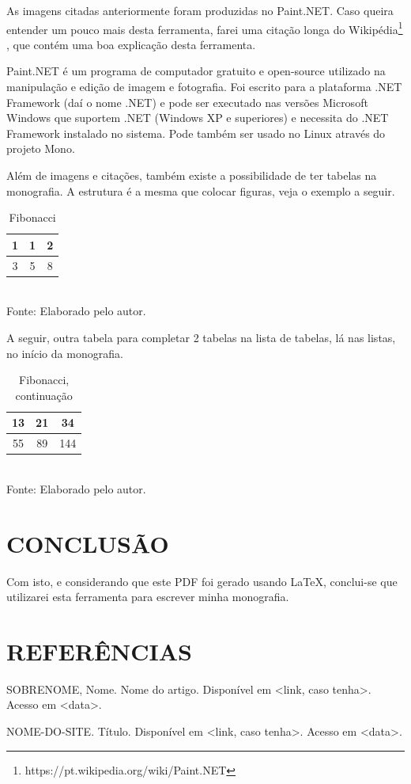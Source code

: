 \documentclass[12pt,a4paper]{article}
\newcommand{\source}[1]{\small Fonte: {#1}}
\begin{document}
	As imagens citadas anteriormente foram produzidas no Paint.NET.
	Caso queira entender um pouco mais desta ferramenta, farei uma citação longa do Wikipédia\footnote{https://pt.wikipedia.org/wiki/Paint.NET}
	, que contém uma boa explicação desta ferramenta.

\begin{longcitation}
	Paint.NET é um programa de computador gratuito e open-source utilizado na manipulação e edição de imagem e fotografia. Foi escrito para a plataforma .NET Framework (daí o nome .NET) e pode ser executado nas versões Microsoft Windows que suportem .NET (Windows XP e superiores) e necessita do .NET Framework instalado no sistema. Pode também ser usado no Linux através do projeto Mono.
\end{longcitation}
	
	Além de imagens e citações, também existe a possibilidade de ter tabelas na monografia.
	A estrutura é a mesma que colocar figuras, veja o exemplo a seguir.

\begin{table}[ht]
	\label{tabela1}
	\caption{Fibonacci}
	\centering
	\begin{tabular}{c c c}
		\hline 
		1 & 1 & 2 \\ 
		\hline 
		3 & 5 & 8 \\ 
		\hline 
	\end{tabular} \\
	\vspace{3mm}
	\source{Elaborado pelo autor.}
\end{table}

	A seguir, outra tabela para completar 2 tabelas na lista de tabelas, lá nas listas, no início da monografia.

\begin{table}[ht]
	\label{tabela2}
	\caption{Fibonacci, continuação}
	\centering
	\begin{tabular}{c c c}
		\hline 
		13 & 21 & 34 \\ 
		\hline 
		55 & 89 & 144 \\ 
		\hline 
	\end{tabular} \\
	\vspace{3mm}
	\source{Elaborado pelo autor.}
\end{table}

\clearpage %
\section{CONCLUSÃO}
	Com isto, e considerando que este PDF foi gerado usando \LaTeX , conclui-se que utilizarei esta ferramenta para escrever minha monografia.

\clearpage %
\section*{REFERÊNCIAS}
	\singlespace
	SOBRENOME, Nome. Nome do artigo. Disponível em <link, caso tenha>. Acesso em <data>.
	
	NOME-DO-SITE. Título. Disponível em <link, caso tenha>. Acesso em <data>.
\end{document}
